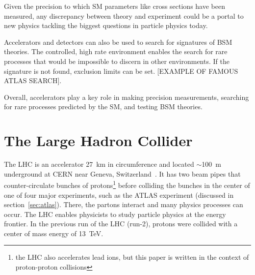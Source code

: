Given the precision to which SM parameters like cross sections have been measured, any discrepancy between theory and experiment could be a portal to new physics tackling the biggest questions in particle physics today. 

Accelerators and detectors can also be used to search for signatures of BSM theories. The controlled, high rate environment enables the search for rare processes that would be impossible to discern in other environments. If the signature is not found, exclusion limits can be set. [EXAMPLE OF FAMOUS ATLAS SEARCH].

Overall, accelerators play a key role in making precision measurements, searching for rare processes predicted by the SM, and testing BSM theories.

\section{The Large Hadron Collider}

The LHC is an accelerator \SI{27}{\kilo\meter} in circumference and located $\sim$\SI{100}{\meter} underground at CERN near Geneva, Switzerland~\cite{evans_lhc_2008}. It has two beam pipes that counter-circulate bunches of protons\footnote{the LHC also accelerates lead ions, but this paper is written in the context of proton-proton collisions} before colliding the bunches in the center of one of four major experiments, such as the ATLAS experiment (discussed in section~\ref{sec:atlas}). There, the partons interact and many physics processes can occur. The LHC enables physicists to study particle physics at the energy frontier. In the previous run of the LHC (run-2), protons were collided with a center of mass energy of \SI{13}{\tera\electronvolt}. 


